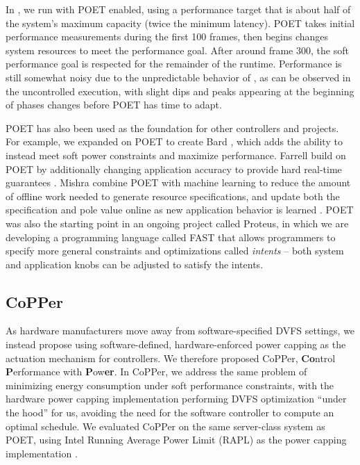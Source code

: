 In , we run with POET enabled, using a performance target that is about half of the system's maximum capacity (\ie twice the minimum latency).
POET takes initial performance measurements during the first 100 frames, then begins changes system resources to meet the performance goal.
After around frame 300, the soft performance goal is respected for the remainder of the runtime.
Performance is still somewhat noisy due to the unpredictable behavior of , as can be observed in the uncontrolled execution, with slight dips and peaks appearing at the beginning of phases changes before POET has time to adapt.

POET has also been used as the foundation for other controllers and projects.
For example, we expanded on POET to create Bard \cite{Bard}, which adds the ability to instead meet soft power constraints and maximize performance.
Farrell \etal build on POET by additionally changing application accuracy to provide hard real-time guarantees \cite{meantime}.
Mishra \etal combine POET with machine learning to reduce the amount of offline work needed to generate resource specifications, and update both the specification and pole value online as new application behavior is learned .
POET was also the starting point in an ongoing project called Proteus, in which we are developing a programming language called FAST that allows programmers to specify more general constraints and optimizations called \emph{intents} -- both system and application knobs can be adjusted to satisfy the intents.


\subsection{CoPPer}

As hardware manufacturers move away from software-specified DVFS settings, we instead propose using software-defined, hardware-enforced power capping as the actuation mechanism for controllers.
We therefore proposed CoPPer, \textbf{Co}ntrol \textbf{P}erformance with \textbf{P}ow\textbf{er}.
In CoPPer, we address the same problem of minimizing energy consumption under soft performance constraints, with the hardware power capping implementation performing DVFS optimization ``under the hood'' for us, avoiding the need for the software controller to compute an optimal schedule.
We evaluated CoPPer on the same server-class system as POET, using Intel Running Average Power Limit (RAPL) as the power capping implementation \cite{RAPL}.

